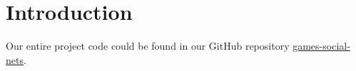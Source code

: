 \section{Introduction}
Our entire project code could be found in our GitHub repository \href{https://github.com/goldmyu/games-social-nets}{games-social-nets}.
